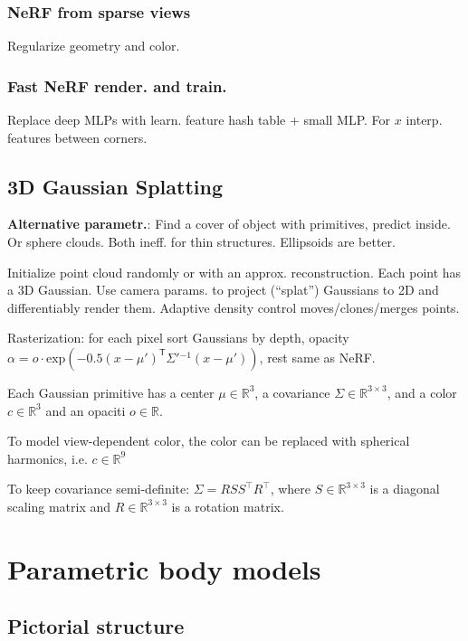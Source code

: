 \documentclass[11pt,landscape,a4paper,fleqn]{article}
\newcommand*{\tran}{^{\mathsf{T}}} %
\newcommand{\R}{\mathbb{R}}
\renewcommand{\exp}{\mathrm{exp}}
\begin{document}
\begin{multicols*}{4}
\subsubsection{NeRF from sparse views} Regularize geometry and color.

\subsubsection{Fast NeRF render. and train.}
Replace deep MLPs with learn. feature hash table + small MLP.
For $x$ interp. features between corners.

\subsection{3D Gaussian Splatting}

\textbf{Alternative parametr.}:
Find a cover of object with primitives, predict inside.
Or sphere clouds. Both ineff. for thin structures.
Ellipsoids are better.

Initialize point cloud randomly or with an approx. reconstruction.
Each point has a 3D Gaussian.
Use camera params. to project (``splat'') Gaussians to 2D
and differentiably render them.
Adaptive density control moves/clones/merges points.

Rasterization: for each pixel sort Gaussians by depth, opacity
$\alpha = o \cdot \exp( - 0.5(x - \mu')\tran \Sigma'{}^{-1}(x - \mu'))$,
rest same as NeRF.

Each Gaussian primitive has a center $\mu \in \R^3$, a covariance $\Sigma \in \R^{3\times 3}$, and a color $c \in \R^3$ and an opaciti $o \in \R$.

To model view-dependent color, the color can be replaced with spherical harmonics, i.e. $c \in \R^9$

To keep covariance semi-definite: $\Sigma = RSS^\top R^\top$, where $S \in \R^{3\times 3}$ is a diagonal scaling matrix and $R \in \R^{3\times 3}$ is a rotation matrix.

% 

\section{Parametric body models}

\subsection{Pictorial structure}


\end{multicols*}
\end{document}
